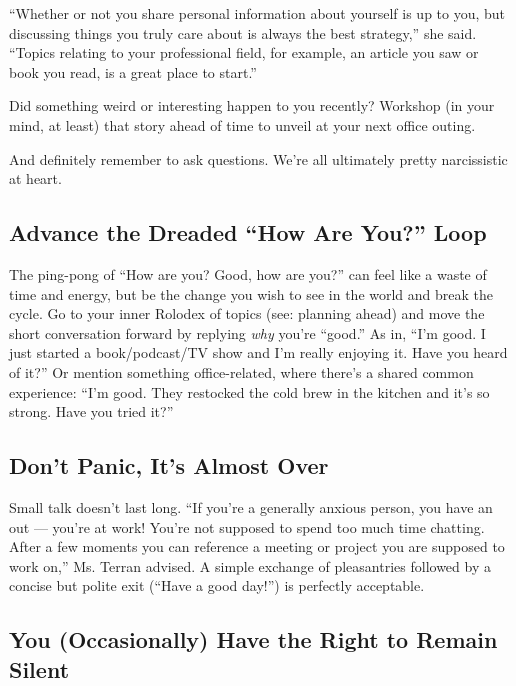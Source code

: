 ``Whether or not you share personal information about yourself is up to
you, but discussing things you truly care about is always the best
strategy,'' she said. ``Topics relating to your professional field, for
example, an article you saw or book you read, is a great place to
start.''

Did something weird or interesting happen to you recently? Workshop (in
your mind, at least) that story ahead of time to unveil at your next
office outing.

And definitely remember to ask questions. We're all ultimately pretty
narcissistic at heart.

\hypertarget{advance-the-dreaded-how-are-you-loop}{%
\subsection{Advance the Dreaded ``How Are You?''
Loop}\label{advance-the-dreaded-how-are-you-loop}}

The ping-pong of ``How are you? Good, how are you?'' can feel like a
waste of time and energy, but be the change you wish to see in the world
and break the cycle. Go to your inner Rolodex of topics (see: planning
ahead) and move the short conversation forward by replying \emph{why}
you're ``good.'' As in, ``I'm good. I just started a book/podcast/TV
show and I'm really enjoying it. Have you heard of it?'' Or mention
something office-related, where there's a shared common experience:
``I'm good. They restocked the cold brew in the kitchen and it's so
strong. Have you tried it?''

\hypertarget{dont-panic-its-almost-over}{%
\subsection{Don't Panic, It's Almost
Over}\label{dont-panic-its-almost-over}}

Small talk doesn't last long. ``If you're a generally anxious person,
you have an out --- you're at work! You're not supposed to spend too
much time chatting. After a few moments you can reference a meeting or
project you are supposed to work on,'' Ms. Terran advised. A simple
exchange of pleasantries followed by a concise but polite exit (``Have a
good day!'') is perfectly acceptable.

\hypertarget{you-occasionally-have-the-right-to-remain-silent}{%
\subsection{You (Occasionally) Have the Right to Remain
Silent}\label{you-occasionally-have-the-right-to-remain-silent}}


